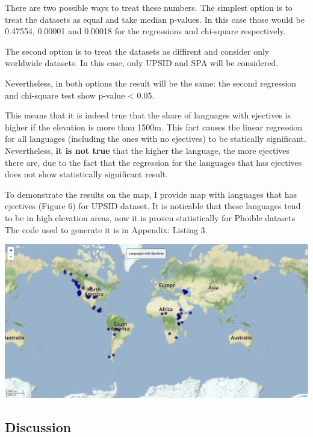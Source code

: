 \documentclass[a4paper,12pt]{article}
\begin{document}
There are two possible ways to treat these numbers. The simplest option is to treat the datasets as equal and take median p-values. In this case those would be 0.47554, 0.00001 and 0.00018 for the regressions and chi-square respectively.

The second option is to treat the datasets as diffirent and consider only worldwide datasets. In this case, only UPSID and SPA will be considered.

Nevertheless, in both options the result will be the same: the second regression and chi-square test show p-value < 0.05.

This means that it is indeed true that the share of languages with ejectives is higher if the elevation is more than 1500m. This fact causes the linear regression for all languages (including the ones with no ejectives) to be statically significant. Nevertheless, \textbf{it is not true} that the higher the language, the more ejectives there are, due to the fact that the regression for the languages that has ejectives does not show statistically significant result.

To demonstrate the results on the map, I provide map with languages that has ejectives (Figure 6) for UPSID dataset. It is noticable that these languages tend to be in high elevation areas, now it is proven statistically for Phoible datasets The code used to generate it is in Appendix: Listing 3.

\noindent
\begin{minipage}{\textwidth}
\includegraphics[width=\textwidth]{images/picture6.png}
\end{minipage}

\subsection{Discussion}
\end{document}

